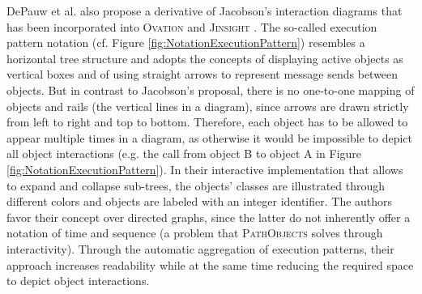DePauw et al. also propose a derivative of Jacobson's interaction diagrams \cite{de_pauw_execution_1998, jacobson_object-oriented_2004} that has been incorporated into \textsc{Ovation} \cite{de_pauw_visualizing_1993, tokoro_modeling_1994} and \textsc{Jinsight} \cite{de_pauw_visualizing_1998}.
The so-called execution pattern notation (cf. Figure \ref{fig:NotationExecutionPattern}) resembles a horizontal tree structure and adopts the concepts of displaying active objects as vertical boxes and of using straight arrows to represent message sends between objects.
But in contrast to Jacobson's proposal, there is no one-to-one mapping of objects and rails (the vertical lines in a diagram), since arrows are drawn strictly from left to right and top to bottom.
Therefore, each object has to be allowed to appear multiple times in a diagram, as otherwise it would be impossible to depict all object interactions (e.g. the call from object B to object A in Figure \ref{fig:NotationExecutionPattern}).
In their interactive implementation that allows to expand and collapse sub-trees, the objects' classes are illustrated through different colors and objects are labeled with an integer identifier.
The authors favor their concept over directed graphs, since the latter do not inherently offer a notation of time and sequence (a problem that \textsc{PathObjects} solves through interactivity).
Through the automatic aggregation of execution patterns, their approach increases readability while at the same time reducing the required space to depict object interactions.

